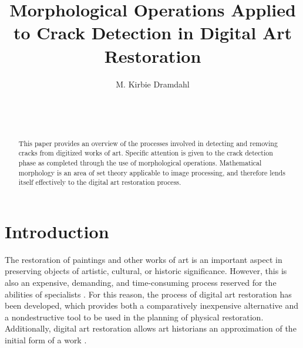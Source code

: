 \documentclass{sig-alternate}
\begin{document}

\title{Morphological Operations Applied to Crack Detection in Digital Art Restoration}


\author{
\alignauthor
M. Kirbie Dramdahl\\
	\\
	\\
	\\
}

\maketitle
\begin{abstract}
This paper provides an overview of the processes involved in detecting and removing cracks from digitized works of art. Specific attention is given to the crack detection phase as completed through the use of morphological operations. Mathematical morphology is an area of set theory applicable to image processing, and therefore lends itself effectively to the digital art restoration process.
\end{abstract}




\section{Introduction}\label{introduction}
The restoration of paintings and other works of art is an important aspect in preserving objects of artistic, cultural, or historic significance. However, this is also an expensive, demanding, and time-consuming process reserved for the abilities of specialists \cite{Theran:2013}. For this reason, the process of digital art restoration has been developed, which provides both a comparatively inexpensive alternative and a nondestructive tool to be used in the planning of physical restoration. Additionally, digital art restoration allows art historians an approximation of the initial form of a work \cite{TopHat:2010}.
\end{document}
